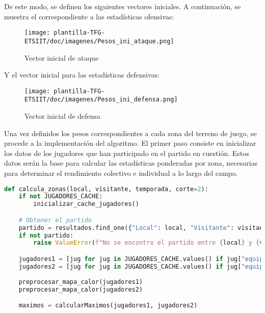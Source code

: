 De este modo, se definen los siguientes vectores iniciales. A continuación, se muestra el correspondiente a las estadísticas ofensivas:

\begin{figure}[H]
    \centering
    \texttt{[image: plantilla-TFG-ETSIIT/doc/imagenes/Pesos\_ini\_ataque.png]}
    \caption{Vector inicial de ataque}
    \label{fig:etiqueta-imagen}
\end{figure}

Y el vector inicial para las estadísticas defensivas:

\begin{figure}[H]
    \centering
    \texttt{[image: plantilla-TFG-ETSIIT/doc/imagenes/Pesos\_ini\_defensa.png]}
    \caption{Vector inicial de defensa}
    \label{fig:etiqueta-imagen}
\end{figure}

Una vez definidos los pesos correspondientes a cada zona del terreno de juego, se procede a la implementación del algoritmo. El primer paso consiste en inicializar los datos de los jugadores que han participado en el partido en cuestión. Estos datos serán la base para calcular las estadísticas ponderadas por zona, necesarias para determinar el rendimiento colectivo e individual a lo largo del campo.

\begin{lstlisting}[language=Python, caption={Inicialización datos}, label={lst:codigo-python}]
def calcula_zonas(local, visitante, temporada, corte=2):
    if not JUGADORES_CACHE:
        inicializar_cache_jugadores()

    # Obtener el partido
    partido = resultados.find_one({"Local": local, "Visitante": visitante, "Temporada": temporada})
    if not partido:
        raise ValueError(f"No se encontro el partido entre {local} y {visitante} en la temporada {temporada}.")

    jugadores1 = [jug for jug in JUGADORES_CACHE.values() if jug["equipo"] == local and jug["rival"] == visitante and jug["temporada"] == temporada]
    jugadores2 = [jug for jug in JUGADORES_CACHE.values() if jug["equipo"] == visitante and jug["rival"] == local and jug["temporada"] == temporada]
    
    preprocesar_mapa_calor(jugadores1)
    preprocesar_mapa_calor(jugadores2)

    maximos = calcularMaximos(jugadores1, jugadores2)

\end{lstlisting}

